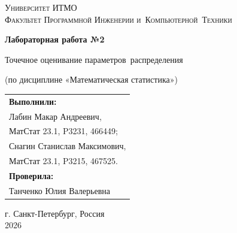 \begin{titlepage}
    \begin{center}
        \large
        \textsc{Университет ИТМО\\
        Факультет Программной Инженерии и~Компьютерной~Техники}
        \vspace*{4cm}
            
        \LARGE
        \textbf{Лабораторная работа №2}

        \vspace{0.5cm}
        \LARGE

        Точечное оценивание параметров~распределения
            
        \vspace{0.5cm}
        \large
        (по дисциплине «Математическая статистика»)

        \vspace{1.5cm}

        \hfill\large
        \begin{tabular}{@{}l@{}}
        \textbf{Выполнили:}\\[2mm]
        Лабин Макар Андреевич,\\
        МатСтат 23.1, P3231, 466449;\\
        Снагин Станислав Максимович,\\
        МатСтат 23.1, P3215, 467525.\\[2mm]
        \textbf{Проверила:}\\[2mm]
        Танченко Юлия Валерьевна
        \end{tabular}
            
        \vfill
            
        \vspace{0.8cm}
            
            
        \Large
        г. Санкт-Петербург, Россия\\
        2026
            
    \end{center}
\end{titlepage}

\renewcommand{\thefootnote}{[\arabic{footnote}]}
